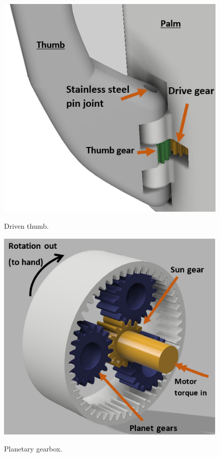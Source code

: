 \documentclass[11pt,3p]{report}
\begin{document}
\begin{figure}[!b]
\begin{minipage}[b]{0.2\textwidth}
    \includegraphics[width=\textwidth]{Driven_thumb} \label{dthumb}
    \caption{Driven thumb.}
  \end{minipage}
  \hfill
  \begin{minipage}[b]{0.2\textwidth}
    \includegraphics[width=\textwidth]{planet} \label{planet}
    \caption{Planetary gearbox.}
  \end{minipage}
\end{figure}
\normalsize

\newpage
\appendix



\end{document}
